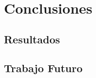 \chapter{Conclusiones}
\minitoc
\label{chap:conclusiones}

\section{Resultados}

\section{Trabajo Futuro}